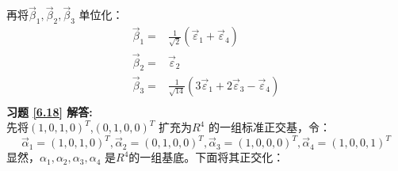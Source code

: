 \documentclass[a4paper]{book}
\begin{document}
再将$\vec{\beta}_1,\vec{\beta}_2,\vec{\beta}_3$ 单位化：
\begin{align*}
\vec{\beta}_1=&\frac{1}{\sqrt{2}}(\vec{\varepsilon}_1+\vec{\varepsilon}_4)\\
\vec{\beta}_2=&\vec{\varepsilon}_2\\
\vec{\beta}_3=&\frac{1}{\sqrt{14}}(3\vec{\varepsilon}_1+2\vec{\varepsilon}_3-\vec{\varepsilon}_4)\\
\end{align*}
\textbf{习题 \ref{6.18} 解答:}\\
先将$(1,0,1,0)^T$,$(0,1,0,0)^T$ 扩充为$R^4$ 的一组标准正交基，令：
\begin{equation*}
\vec{\alpha}_1=(1,0,1,0)^T,\vec{\alpha}_2=(0,1,0,0)^T,\vec{\alpha}_3=(1,0,0,0)^T,\vec{\alpha}_4=(1,0,0,1)^T
\end{equation*}
显然，$\alpha_1,\alpha_2,\alpha_3,\alpha_4$ 是$R^4$的一组基底。下面将其正交化：
\end{document}
